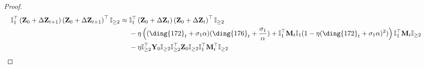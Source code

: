 \documentclass{article}
\theoremstyle{plain}
\theoremstyle{remark}
\def\bY{\mathbf{Y}}
\def\bZ{\mathbf{Z}}
\newcommand{\cc}[1]{\text{\ding{\number\numexpr#1 + 171\relax}}}
\begin{document}
\begin{proof}
    \begin{align*}
        \mathbb{I}_{1}^\top\left(\bZ_0+\Delta\bZ_{t+1}\right)\left(\bZ_0+\Delta\bZ_{t+1}\right)^\top\mathbb{I}_{\ge2}
        &\approx
            \mathbb{I}_{1}^\top\left(\bZ_0+\Delta\bZ_t\right)\left(\bZ_0+\Delta\bZ_t\right)^\top\mathbb{I}_{\ge2}
            \\
            &~~~~
                -\eta\left((\cc{1}_t+\sigma_1\alpha)(\cc{5}_t+\frac{\sigma_1}{\alpha})+\mathbb{I}_{1}^\top\mathbf{M}_t\mathbb{I}_{1}(1-\eta(\cc{1}_t+\sigma_1\alpha)^2)\right)\mathbb{I}_{1}^\top\mathbf{M}_t\mathbb{I}_{\ge2}
            \\
            &~~~~
                -\eta\mathbb{I}_{\ge2}^\top\bY_0\mathbb{I}_{\ge2}\mathbb{I}_{\ge2}^\top\bZ_0\mathbb{I}_{\ge2}\mathbb{I}_{1}^\top\mathbf{M}_t^\top\mathbb{I}_{\ge2}
    \end{align*}



\end{proof}
\end{document}
